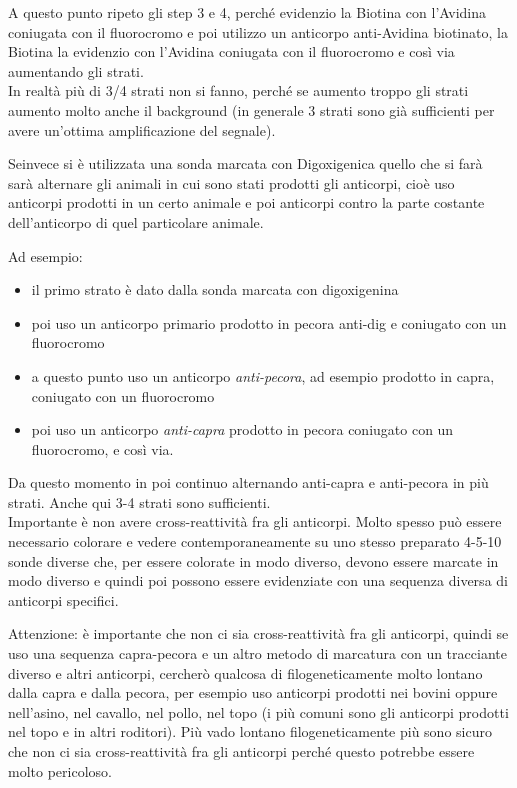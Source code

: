 \documentclass[11pt]{book}
\begin{document}
A questo punto ripeto gli step 3 e 4, perché evidenzio la Biotina con l’Avidina coniugata con il fluorocromo e poi utilizzo un anticorpo anti-Avidina biotinato, la Biotina la evidenzio con l’Avidina coniugata con il fluorocromo e così via aumentando gli strati.\\
In realtà più di 3/4 strati non si fanno, perché se aumento troppo gli strati aumento molto anche il background (in generale 3 strati sono già sufficienti per avere un’ottima amplificazione del segnale).

Seinvece si è utilizzata una sonda marcata con Digoxigenica quello che si farà sarà alternare gli animali in cui sono stati prodotti gli anticorpi, cioè uso anticorpi prodotti in un certo animale e poi anticorpi contro la parte costante dell’anticorpo di quel particolare animale.

\clearpage
Ad esempio:
\begin{itemize}
\item il primo strato è dato dalla sonda marcata con digoxigenina
\item poi uso un anticorpo primario prodotto in pecora anti-dig e coniugato con un fluorocromo
\item a questo punto uso un anticorpo \emph{anti-pecora}, ad esempio prodotto in capra, coniugato con un fluorocromo
\item poi uso un anticorpo \emph{anti-capra} prodotto in pecora coniugato con un fluorocromo, e così via.
\end{itemize}
Da questo momento in poi continuo alternando anti-capra e anti-pecora in più strati. Anche qui 3-4 strati sono sufficienti.\\
Importante è non avere cross-reattività fra gli anticorpi. Molto spesso può essere necessario colorare e vedere contemporaneamente su uno stesso preparato 4-5-10 sonde diverse che, per essere colorate in modo diverso, devono essere marcate in modo diverso e quindi poi possono essere evidenziate con una sequenza diversa di anticorpi specifici.

Attenzione: è importante che non ci sia cross-reattività fra gli anticorpi, quindi se uso una sequenza capra-pecora e un altro metodo di marcatura con un tracciante diverso e altri anticorpi, cercherò qualcosa di filogeneticamente molto lontano dalla capra e dalla pecora, per esempio uso anticorpi prodotti nei bovini oppure nell’asino, nel cavallo, nel pollo, nel topo (i più comuni sono gli anticorpi prodotti nel topo e in altri roditori). Più vado lontano filogeneticamente più sono sicuro che non ci sia cross-reattività fra gli anticorpi perché questo potrebbe essere molto pericoloso.
\end{document}
